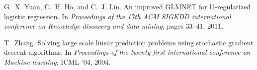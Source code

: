 \documentclass[twoside]{article}
\begin{document}
\begin{thebibliography}{45}
G.~X. Yuan, C.~H. Ho, and C.~J. Lin.
\newblock An improved {GLMNET} for l1-regularized logistic regression.
\newblock In \emph{Proceedings of the 17th ACM SIGKDD international conference
  on Knowledge discovery and data mining}, pages 33--41, 2011.

T.~Zhang.
\newblock Solving large scale linear prediction problems using stochastic
  gradient descent algorithms.
\newblock In \emph{Proceedings of the twenty-first international conference on
  Machine learning}, ICML '04, 2004.

\end{thebibliography}
\end{document}
